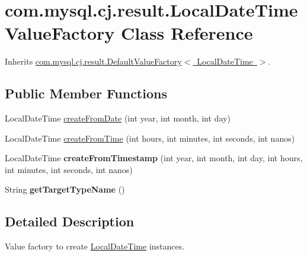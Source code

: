 \hypertarget{classcom_1_1mysql_1_1cj_1_1result_1_1_local_date_time_value_factory}{}\section{com.\+mysql.\+cj.\+result.\+Local\+Date\+Time\+Value\+Factory Class Reference}
\label{classcom_1_1mysql_1_1cj_1_1result_1_1_local_date_time_value_factory}


Inherits \mbox{\hyperlink{classcom_1_1mysql_1_1cj_1_1result_1_1_default_value_factory}{com.\+mysql.\+cj.\+result.\+Default\+Value\+Factory$<$ Local\+Date\+Time $>$}}.

\subsection*{Public Member Functions}
\begin{DoxyCompactItemize}
\item 
Local\+Date\+Time \mbox{\hyperlink{classcom_1_1mysql_1_1cj_1_1result_1_1_local_date_time_value_factory_acc1132dc0e12080882860fa3e4449594}{create\+From\+Date}} (int year, int month, int day)
\item 
Local\+Date\+Time \mbox{\hyperlink{classcom_1_1mysql_1_1cj_1_1result_1_1_local_date_time_value_factory_a19f3b513bc3edf16cf9958886c6b2233}{create\+From\+Time}} (int hours, int minutes, int seconds, int nanos)
\item 
\mbox{\label{classcom_1_1mysql_1_1cj_1_1result_1_1_local_date_time_value_factory_a581f20c2279af34eb22091352a12271b}} 
Local\+Date\+Time {\bfseries create\+From\+Timestamp} (int year, int month, int day, int hours, int minutes, int seconds, int nanos)
\item 
\mbox{\label{classcom_1_1mysql_1_1cj_1_1result_1_1_local_date_time_value_factory_a900e37dad9b8f0167f8dc251ebe72846}} 
String {\bfseries get\+Target\+Type\+Name} ()
\end{DoxyCompactItemize}


\subsection{Detailed Description}
Value factory to create \mbox{\hyperlink{}{Local\+Date\+Time}} instances. 

